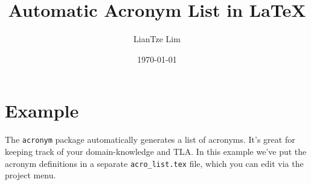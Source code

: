 \documentclass[12pt]{article}
\title{Automatic Acronym List in \LaTeX}
\author{LianTze Lim}
\date{\today}
\begin{document}
\maketitle



\section{Example}

The \texttt{acronym} package automatically generates a list of acronyms. It's great for keeping track of your domain-knowledge and \ac{TLA}. In this example we've put the acronym definitions in a separate \verb|acro_list.tex| file, which you can edit via the project menu.
\end{document}
